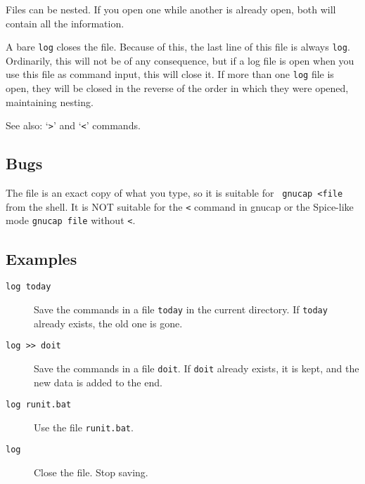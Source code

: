 Files can be nested.  If you open one while another is already open, both
will contain all the information.

A bare {\tt log} closes the file.  Because of this, the last line of this
file is always {\tt log}.  Ordinarily, this will not be of any consequence,
but if a log file is open when you use this file as command input, this will
close it.  If more than one {\tt log} file is open, they will be closed in
the reverse of the order in which they were opened, maintaining nesting.

See also: `{\tt >}' and `{\tt <}' commands.
\subsection{Bugs}

The file is an exact copy of what you type, so it is suitable for {\tt
gnucap <file} from the shell.  It is NOT suitable for the {\tt <}
command in gnucap or the Spice-like mode {\tt gnucap file} without
{\tt <}.
\subsection{Examples}

\begin{description}

\item[{\tt log today}] Save the commands in a file {\tt today} in the
current directory.  If {\tt today} already exists, the old one is gone.

\item[{\tt log >> doit}] Save the commands in a file {\tt doit}.  If
{\tt doit} already exists, it is kept, and the new data is added to the
end.

\item[{\tt log runit.bat}] Use the file {\tt runit.bat}.

\item[{\tt log}] Close the file.  Stop saving.

\end{description}

